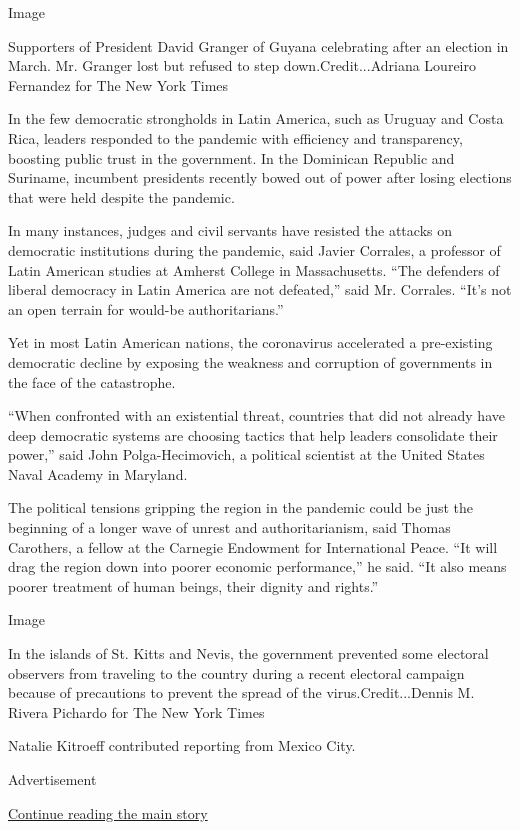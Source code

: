 Image

Supporters of President David Granger of Guyana celebrating after an
election in March. Mr. Granger lost but refused to step
down.Credit...Adriana Loureiro Fernandez for The New York Times

In the few democratic strongholds in Latin America, such as Uruguay and
Costa Rica, leaders responded to the pandemic with efficiency and
transparency, boosting public trust in the government. In the Dominican
Republic and Suriname, incumbent presidents recently bowed out of power
after losing elections that were held despite the pandemic.

In many instances, judges and civil servants have resisted the attacks
on democratic institutions during the pandemic, said Javier Corrales, a
professor of Latin American studies at Amherst College in Massachusetts.
``The defenders of liberal democracy in Latin America are not
defeated,'' said Mr. Corrales. ``It's not an open terrain for would-be
authoritarians.''

Yet in most Latin American nations, the coronavirus accelerated a
pre-existing democratic decline by exposing the weakness and corruption
of governments in the face of the catastrophe.

``When confronted with an existential threat, countries that did not
already have deep democratic systems are choosing tactics that help
leaders consolidate their power,'' said John Polga-Hecimovich, a
political scientist at the United States Naval Academy in Maryland.

The political tensions gripping the region in the pandemic could be just
the beginning of a longer wave of unrest and authoritarianism, said
Thomas Carothers, a fellow at the Carnegie Endowment for International
Peace. ``It will drag the region down into poorer economic
performance,'' he said. ``It also means poorer treatment of human
beings, their dignity and rights.''

Image

In the islands of St. Kitts and Nevis, the government prevented some
electoral observers from traveling to the country during a recent
electoral campaign because of precautions to prevent the spread of the
virus.Credit...Dennis M. Rivera Pichardo for The New York Times

Natalie Kitroeff contributed reporting from Mexico City.

Advertisement

\protect\hyperlink{after-bottom}{Continue reading the main story}

